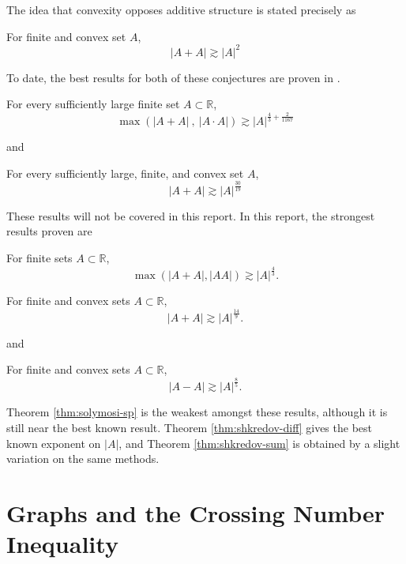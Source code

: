 \documentclass[12pt,reqno]{amsart}
\begin{document}
The idea that convexity opposes additive structure is stated precisely as

\begin{conjecture}
    For finite and convex set \(A\),
    \[
        \left\lvert A+A \right\rvert \gtrsim   \left\lvert A \right\rvert ^{2}
    \]
\end{conjecture}

To date, the best results for both of these conjectures are proven in \cite{stevens-rudnev}.
\begin{theorem}
    For every sufficiently large finite set \(A \subset \mathbb{R} \),
    \[
        \max \left( \left\lvert A+A \right\rvert ~,~ \left\lvert A \cdot A \right\rvert  \right) \gtrsim    \left\lvert A \right\rvert^{\frac{4}{3} + \frac{2}{1167}}
    \]
\end{theorem}
and
\begin{theorem}
    For every sufficiently large, finite, and convex set \(A\),
    \[
        \left\lvert A+A \right\rvert \gtrsim   \left\lvert A \right\rvert ^{\frac{30}{19} }
    \]
\end{theorem}

These results will not be covered in this report. In this report,
the strongest results proven are
\begin{theorem}\label{thm:solymosi-sp}
For finite sets \(A \subset \mathbb{R} \),
\[
    \max \left( \left\lvert A+A \right\rvert , \left\lvert AA \right\rvert  \right) \gtrsim \left\lvert A \right\rvert ^{\frac{4}{3} }
.\]
\end{theorem}
\begin{theorem}\label{thm:shkredov-sum}
For finite and convex sets \(A \subset \mathbb{R} \),
\[
    \left\lvert A + A \right\rvert \gtrsim  \left\lvert A \right\rvert ^{\frac{14}{9} }
.\]
\end{theorem}
and
\begin{theorem}\label{thm:shkredov-diff}
For finite and convex sets \(A \subset \mathbb{R} \),
\[
    \left\lvert A - A \right\rvert \gtrsim \left\lvert A \right\rvert ^{\frac{8}{5} }
.\]
\end{theorem}

Theorem \ref{thm:solymosi-sp} is the weakest amongst these results, although it is
still near the best known result.
Theorem \ref{thm:shkredov-diff} gives the best known exponent on \(\left\lvert A \right\rvert \), and
Theorem \ref{thm:shkredov-sum} is obtained by a slight variation on the same methods.

\section{Graphs and the Crossing Number Inequality}
\end{document}
